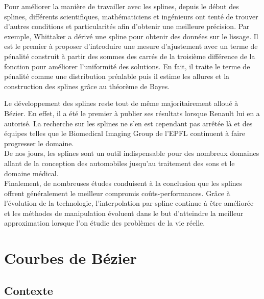 \documentclass{article}
\begin{document}
\par
	Pour am\'{e}liorer la mani\`{e}re de travailler avec les splines, depuis le d\'{e}but des splines, diff\'{e}rents scientifiques, math\'{e}maticiens et ing\'{e}nieurs ont tent\'{e} de trouver d'autres conditions et particularit\'{e}s afin d'obtenir une meilleure pr\'{e}cision. Par exemple, Whittaker a d\'{e}riv\'{e} une spline pour obtenir des donn\'{e}es sur le lissage. Il est le premier \`{a} proposer d'introduire une mesure d'ajustement avec un terme de p\'{e}nalit\'{e} construit \`{a} partir des sommes des carr\'{e}s de la troisi\`{e}me diff\'{e}rence de la fonction pour am\'{e}liorer l'uniformit\'{e} des solutions. En fait, il traite le terme de p\'{e}nalit\'{e} comme une distribution pr\'{e}alable puis il estime les allures et la construction des splines gr\^{a}ce au th\'{e}or\`{e}me de Bayes.
\par
	Le d\'{e}veloppement des splines reste tout de m\^{e}me majoritairement allou\'{e} \`{a} B\'{e}zier. En effet, il a \'{e}t\'{e} le premier \`{a} publier ses r\'{e}sultats lorsque Renault lui en a autoris\'{e}. La recherche sur les splines ne s'en est cependant pas arr\^{e}t\'{e}e l\`{a} et des \'{e}quipes telles que le Biomedical Imaging Group de l'EPFL continuent \`{a} faire progresser le domaine.
\\
\indent
	De nos jours, les splines sont un outil indispensable pour des nombreux domaines allant de la conception des automobiles jusqu'au traitement des sons et le domaine m\'{e}dical.
\\
\indent
	Finalement, de nombreuses \'{e}tudes conduisent \`{a} la conclusion que les splines offrent g\'{e}n\'{e}ralement le meilleur compromis co\^{u}ts-performances. Gr\^{a}ce \`{a} l'\'{e}volution de la technologie, l'interpolation par spline continue \`{a} \^{e}tre am\'{e}lior\'{e}e et les m\'{e}thodes de manipulation \'{e}voluent dans le but d'atteindre la meilleur approximation lorsque l'on \'{e}tudie des probl\`{e}mes de la vie r\'{e}elle.

\newpage
\section{Courbes de B\'{e}zier} 
\subsection{Contexte}
\end{document}
